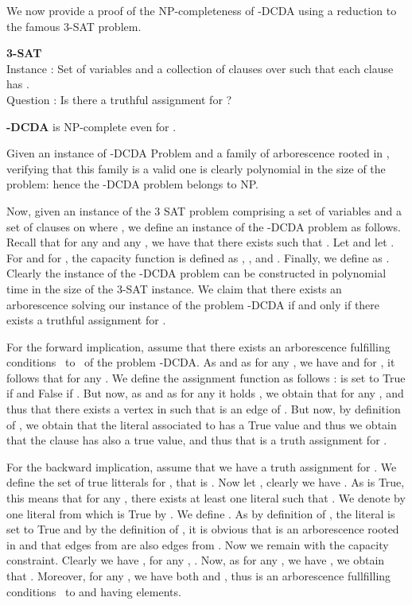 We now provide a proof of the NP-completeness of -DCDA using a
reduction to the famous 3-SAT problem.

{\noindent\bf 3-SAT\\} {\sc Instance :}
Set  of variables and a collection  of clauses over  such that each clause  has .\\
{\sc Question :} Is there a truthful assignment for ?

\begin{theorem}
  {\bf -DCDA} is NP-complete even for .
\end{theorem}

\bpr Given an instance of -DCDA Problem and a family  of  arborescence rooted
in , verifying that this family is a valid one is clearly
polynomial in the size of the problem: hence the -DCDA problem
belongs to NP.



Now, given an instance of the 3 SAT problem comprising
 a set of variables and
 a set of clauses on  where
, we define an instance of the
-DCDA problem as follows.  Recall that for any 
and any , we have that there exists 
such that . Let  and
let .  For  and for , the capacity function is defined as , ,
 and .  Finally, we define
 as .  Clearly the instance of the -DCDA problem
can be constructed in polynomial time in the size of the 3-SAT
instance.  We claim that there exists an arborescence 
solving our instance of the problem -DCDA if and only if there
exists a truthful assignment for .


For the forward implication, assume that there exists an arborescence
 fulfilling conditions~ to~ of the problem
-DCDA.  As  and as for any , we have
 and  for , it follows that
 for any .  We
define the assignment function  as follows : 
is set to True if  and False if .
But now, as  and as for any  it holds
, we obtain that for any ,  and thus that there exists a vertex  in
 such that  is an
edge of .  But now, by definition of , we obtain that the
literal associated to  has a True value and thus we obtain that
the clause  has also a true value, and thus that  is a
truth assignment for .

For the backward implication, assume that we have a truth assignment
 for .  We define  the set of true litterals for
, that is .  Now let
, clearly we have
.  As  is True, this means that for any , there exists at least one literal  such that
.  We denote by  one literal from  which
is True by .  We define .  As by definition of , the literal  is set to True
and by the definition of , it is obvious that  is an
arborescence rooted in  and that edges from  are also edges from
.  Now we remain with the capacity constraint.  Clearly we have
, for any , .  Now, as for any
, we have , we
obtain that .  Moreover, for any , we have
both  and , thus  is
an arborescence fullfilling conditions~ to  and having
 elements.  \epr

